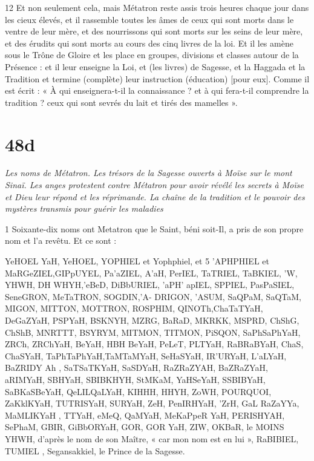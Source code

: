 \par 12 Et non seulement cela, mais Métatron reste assis trois heures chaque jour dans les cieux élevés, et il rassemble toutes les âmes de ceux qui sont morts dans le ventre de leur mère, et des nourrissons qui sont morts sur les seins de leur mère, et des érudits qui sont morts au cours des cinq livres de la loi. Et il les amène sous le Trône de Gloire et les place en groupes, divisions et classes autour de la Présence : et il leur enseigne la Loi, et (les livres) de Sagesse, et la Haggada et la Tradition et termine (complète) leur instruction (éducation) [pour eux]. Comme il est écrit : « À qui enseignera-t-il la connaissance ? et à qui fera-t-il comprendre la tradition ? ceux qui sont sevrés du lait et tirés des mamelles ».


\chapter{48d}

\par \textit{Les noms de Métatron. Les trésors de la Sagesse ouverts à Moïse sur le mont Sinaï. Les anges protestent contre Métatron pour avoir révélé les secrets à Moïse et Dieu leur répond et les réprimande. La chaîne de la tradition et le pouvoir des mystères transmis pour guérir les maladies}

\par 1 Soixante-dix noms ont Metatron que le Saint, béni soit-Il, a pris de son propre nom et l'a revêtu. Et ce sont :

\par YeHOEL YaH, YeHOEL, YOPHIEL et Yophphiel, et 5 'APHPHIEL et MaRGeZIEL,GIPpUYEL, Pa'aZIEL, A'aH, PerIEL, TaTRIEL, TaBKIEL, 'W, YHWH, DH WHYH,'eBeD, DiBbURIEL, 'aPH' apIEL, SPPIEL, PasPaSIEL, SeneGRON, MeTaTRON, SOGDIN,'A- DRIGON, 'ASUM, SaQPaM, SaQTaM, MIGON, MITTON, MOTTRON, ROSPHIM, QINOTh,ChaTaTYaH, DeGaZYaH, PSPYaH, BSKNYH, MZRG, BaRaD, MKRKK, MSPRD, ChShG, ChShB, MNRTTT, BSYRYM, MITMON, TITMON, PiSQON, SaPhSaPhYaH, ZRCh, ZRChYaH, BeYaH, HBH BeYaH, PeLeT, PLTYaH, RaBRaBYaH, ChaS, ChaSYaH, TaPhTaPhYaH,TaMTaMYaH, SeHaSYaH, IR'URYaH, L'aLYaH, BaZRIDY Ah , SaTSaTKYaH, SaSDYaH, RaZRaZYAH, BaZRaZYaH, aRIMYaH, SBHYaH, SBIBKHYH, StMKaM, YaHSeYaH, SSBIBYaH, SaBKaSBeYaH, QeLILQaLYaH, KIHHH, HHYH, ZoWH, POURQUOI, ZaKklKYaH, TUTRISYaH, SURYaH, ZeH, PenIRHYaH, 'ZrH, GaL RaZaYYa, MaMLIKYaH , TTYaH, eMeQ, QaMYaH, MeKaPpeR YaH, PERISHYAH, SePhaM, GBIR, GiBbORYaH, GOR, GOR YaH, ZIW, OKBaR, le MOINS YHWH, d'après le nom de son Maître, « car mon nom est en lui », RaBIBIEL, TUMIEL , Segansakkiel, le Prince de la Sagesse.

